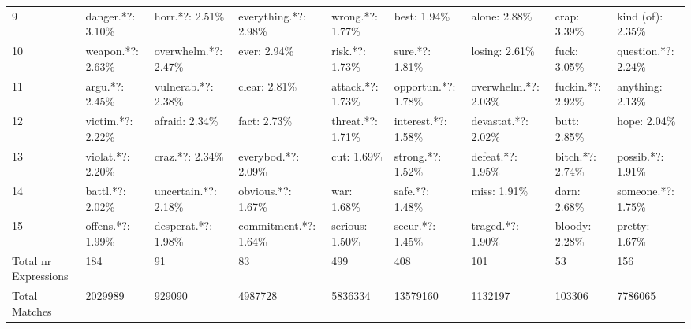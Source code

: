 \begin{tabular}{lllllllll}
9                    &          danger.*?: 3.10\% &       horr.*?: 2.51\% &  everything.*?: 2.98\% &      wrong.*?: 1.77\% &         best: 1.94\% &          alone: 2.88\% &              crap: 3.39\% &     kind (of): 2.35\% \\
10                   &          weapon.*?: 2.63\% &  overwhelm.*?: 2.47\% &           ever: 2.94\% &       risk.*?: 1.73\% &      sure.*?: 1.81\% &         losing: 2.61\% &              fuck: 3.05\% &   question.*?: 2.24\% \\
11                   &            argu.*?: 2.45\% &   vulnerab.*?: 2.38\% &          clear: 2.81\% &     attack.*?: 1.73\% &  opportun.*?: 1.78\% &   overwhelm.*?: 2.03\% &         fuckin.*?: 2.92\% &      anything: 2.13\% \\
12                   &          victim.*?: 2.22\% &        afraid: 2.34\% &           fact: 2.73\% &     threat.*?: 1.71\% &  interest.*?: 1.58\% &    devastat.*?: 2.02\% &              butt: 2.85\% &          hope: 2.04\% \\
13                   &          violat.*?: 2.20\% &       craz.*?: 2.34\% &    everybod.*?: 2.09\% &           cut: 1.69\% &    strong.*?: 1.52\% &      defeat.*?: 1.95\% &          bitch.*?: 2.74\% &     possib.*?: 1.91\% \\
14                   &           battl.*?: 2.02\% &  uncertain.*?: 2.18\% &     obvious.*?: 1.67\% &           war: 1.68\% &      safe.*?: 1.48\% &           miss: 1.91\% &              darn: 2.68\% &    someone.*?: 1.75\% \\
15                   &          offens.*?: 1.99\% &   desperat.*?: 1.98\% &  commitment.*?: 1.64\% &       serious: 1.50\% &     secur.*?: 1.45\% &      traged.*?: 1.90\% &            bloody: 2.28\% &        pretty: 1.67\% \\
Total nr Expressions &                        184 &                    91 &                     83 &                   499 &                  408 &                    101 &                        53 &                   156 \\
Total Matches        &                    2029989 &                929090 &                4987728 &               5836334 &             13579160 &                1132197 &                    103306 &               7786065 \\
\bottomrule
\end{tabular}
